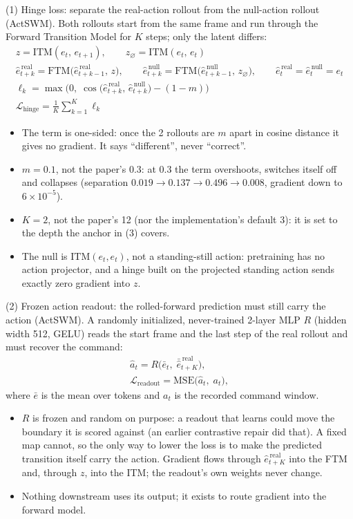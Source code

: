 \documentclass[12pt,a4paper,oneside]{report}
\begin{document}
\newpage
\noindent (1) Hinge loss: separate the real-action rollout from the null-action rollout (ActSWM). Both rollouts
start from the same frame and run through the Forward Transition Model for $K$ steps; only the latent differs:
\begin{gather}
z = \mathrm{ITM}(e_t,\, e_{t+1}), \qquad z_{\varnothing} = \mathrm{ITM}(e_t,\, e_t) \\
\hat e^{\,\mathrm{real}}_{t+k} = \mathrm{FTM}\big(\hat e^{\,\mathrm{real}}_{t+k-1},\, z\big), \qquad
\hat e^{\,\mathrm{null}}_{t+k} = \mathrm{FTM}\big(\hat e^{\,\mathrm{null}}_{t+k-1},\, z_{\varnothing}\big), \qquad
\hat e^{\,\mathrm{real}}_{t} = \hat e^{\,\mathrm{null}}_{t} = e_t \\
\ell_k = \max\!\Big(0,\; \cos\!\big(\hat e^{\,\mathrm{real}}_{t+k},\, \hat e^{\,\mathrm{null}}_{t+k}\big) - (1 - m)\Big) \\
\mathcal{L}_{\text{hinge}} = \frac{1}{K}\sum_{k=1}^{K} \ell_k
\end{gather}
\begin{itemize}[label=--]
\item The term is one-sided: once the 2 rollouts are $m$ apart in cosine distance it gives no gradient. It says
  ``different'', never ``correct''.
\item $m = 0.1$, not the paper's 0.3: at 0.3 the term overshoots, switches itself off and collapses (separation
  $0.019 \to 0.137 \to 0.496 \to 0.008$, gradient down to $6\times10^{-5}$).
\item $K = 2$, not the paper's 12 (nor the implementation's default 3): it is set to the depth the anchor in (3) covers.
\item The null is $\mathrm{ITM}(e_t, e_t)$, not a standing-still action: pretraining has no action projector, and a
  hinge built on the projected standing action sends exactly zero gradient into $z$.
\end{itemize}

\noindent (2) Frozen action readout: the rolled-forward prediction must still carry the action (ActSWM). A
randomly initialized, never-trained 2-layer MLP $R$ (hidden width 512, GELU) reads the start frame and the last step of
the real rollout and must recover the command:
\begin{gather}
\hat a_t = R\big(\bar e_t,\; \bar{\hat e}^{\,\mathrm{real}}_{t+K}\big), \\
\mathcal{L}_{\text{readout}} = \mathrm{MSE}\big(\hat a_t,\; a_t\big),
\end{gather}
where $\bar e$ is the mean over tokens and $a_t$ is the recorded command window.
\begin{itemize}[label=--]
\item $R$ is frozen and random on purpose: a readout that learns could move the boundary it is scored against (an
  earlier contrastive repair did that). A fixed map cannot, so the only way to lower the loss is to make the
  predicted transition itself carry the action. Gradient flows through $\hat e^{\,\mathrm{real}}_{t+K}$ into the FTM and,
  through $z$, into the ITM; the readout's own weights never change.
\item Nothing downstream uses its output; it exists to route gradient into the forward model.
\end{itemize}
\end{document}

